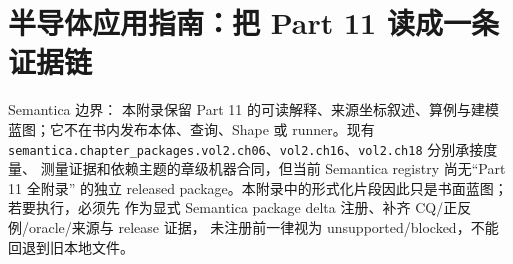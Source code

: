 \chapter{半导体应用指南：把 Part 11 读成一条证据链}

\begin{noteblock}
Semantica 边界： 本附录保留 Part 11 的可读解释、来源坐标叙述、算例与建模
蓝图；它不在书内发布本体、查询、Shape 或 runner。现有
\nolinkurl{semantica.chapter_packages.vol2.ch06}、\nolinkurl{vol2.ch16}、\nolinkurl{vol2.ch18} 分别承接度量、
测量证据和依赖主题的章级机器合同，但当前 Semantica registry 尚无“Part 11 全附录”
的独立 released package。本附录中的形式化片段因此只是书面蓝图；若要执行，必须先
作为显式 Semantica package delta 注册、补齐 CQ/正反例/oracle/来源与 release 证据，
未注册前一律视为 unsupported/blocked，不能回退到旧本地文件。
\end{noteblock}

